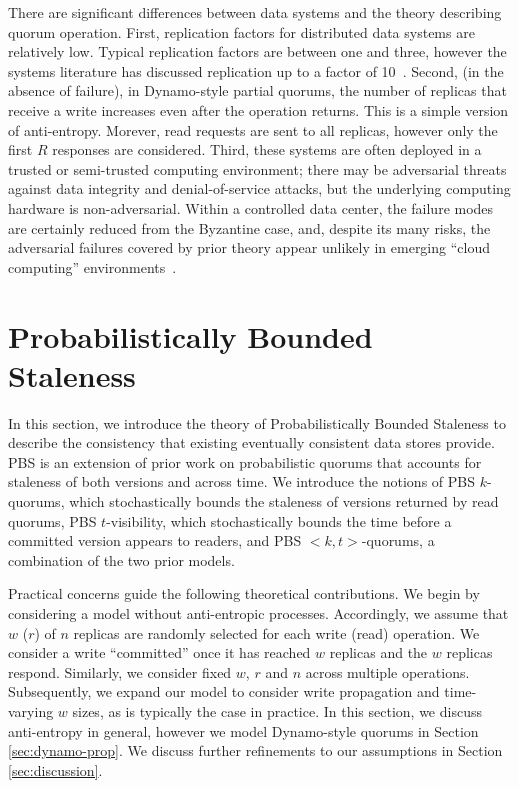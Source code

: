\documentclass{vldb}
\begin{document}
There are significant differences between data systems and the theory
describing quorum operation.  First, replication factors for
distributed data systems are relatively low.  Typical replication
factors are between one and three, however the systems literature has
discussed replication up to a factor of 10~\cite{chain-replication}.
Second, (in the absence of failure), in Dynamo-style partial quorums,
the number of replicas that receive a write increases even after the
operation returns.  This is a simple version of anti-entropy.
Morever, read requests are sent to all replicas, however only the
first $R$ responses are considered.  Third, these systems are often
deployed in a trusted or semi-trusted computing environment; there may
be adversarial threats against data integrity and denial-of-service
attacks, but the underlying computing hardware is
non-adversarial. Within a controlled data center, the failure modes
are certainly reduced from the Byzantine case, and, despite its many
risks, the adversarial failures covered by prior theory appear
unlikely in emerging ``cloud computing'' environments~\cite{needed}.


\section{Probabilistically Bounded\\Staleness}
\label{sec:pbs}

In this section, we introduce the theory of Probabilistically Bounded
Staleness to describe the consistency that existing eventually
consistent data stores provide.  PBS is an extension of prior work on
probabilistic quorums that accounts for staleness of both versions and
across time.  We introduce the notions of PBS $k$-quorums, which
stochastically bounds the staleness of versions returned by read
quorums, PBS $t$-visibility, which stochastically bounds the time
before a committed version appears to readers, and PBS $<k,
t>$-quorums, a combination of the two prior models.


Practical concerns guide the following theoretical contributions.  We
begin by considering a model without anti-entropic processes.
Accordingly, we assume that $w$ ($r$) of $n$ replicas are randomly
selected for each write (read) operation.  We consider a write
``committed'' once it has reached $w$ replicas and the $w$ replicas
respond.  Similarly, we consider fixed $w$, $r$ and $n$ across
multiple operations. Subsequently, we expand our model to consider
write propagation and time-varying $w$ sizes, as is typically the case
in practice.  In this section, we discuss anti-entropy in general,
however we model Dynamo-style quorums in Section
\ref{sec:dynamo-prop}. We discuss further refinements to our
assumptions in Section \ref{sec:discussion}.
\end{document}
